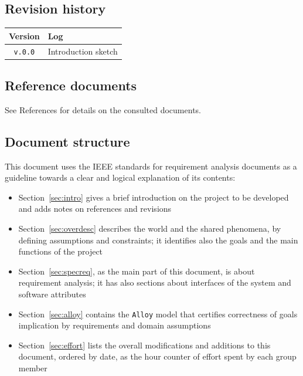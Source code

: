 \documentclass[12pt]{article}
\begin{document}
  \subsection{Revision history}

  \label{sec:revhistory}
    \begin{table}[!h]
      \begin{tabular}{|c|l|}
        \hline
        \textbf{Version}                & \textbf{Log} \\ \hline
        \texttt{v.0.0} &
          Introduction sketch
        \\ \hline
      \end{tabular}
    \end{table}

  \subsection{Reference documents}

    See References for details on the consulted documents.

  \subsection{Document structure}

    This document uses the IEEE standards for requirement analysis documents as a guideline towards a clear and logical explanation of its contents:
    \begin{itemize}
      \item Section~\ref{sec:intro} gives a brief introduction on the project to be developed and adds notes on references and revisions
      \item Section~\ref{sec:overdesc} describes the world and the shared phenomena, by defining assumptions and constraints; it identifies also the goals and the main functions of the project
      \item Section~\ref{sec:specreq}, as the main part of this document, is about requirement analysis; it has also sections about interfaces of the system and software attributes
      \item Section~\ref{sec:alloy} contains the \texttt{Alloy} model that certifies correctness of goals implication by requirements and domain assumptions
      \item Section~\ref{sec:effort} lists the overall modifications and additions to this document, ordered by date, as the hour counter of effort spent by each group member
    \end{itemize}
\end{document}
